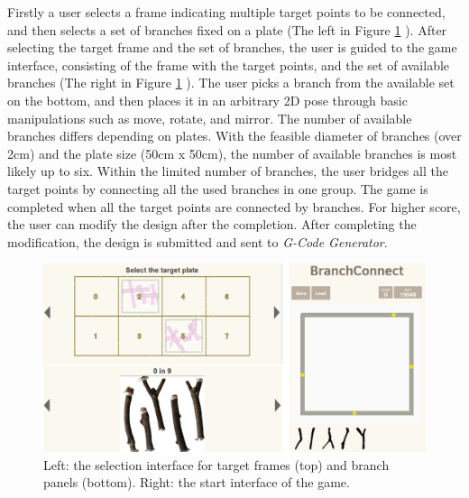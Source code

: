 Firstly a user selects a frame indicating multiple target points to be connected, and then selects a set of branches fixed on a plate (The left in Figure \ref{fig:game_interface} ).
After selecting the target frame and the set of branches, the user is guided to the game interface, consisting of the frame with the target points, and the set of available branches (The right in Figure \ref{fig:game_interface} ).
The user picks a branch from the available set on the bottom, and then places it in an arbitrary 2D pose through basic manipulations such as move, rotate, and mirror.
The number of available branches differs depending on plates.
With the feasible diameter of branches (over 2cm) and the plate size (50cm x 50cm), the number of available branches is most likely up to six.
Within the limited number of branches, the user bridges all the target points by connecting all the used branches in one group.
The game is completed when all the target points are connected by branches.
For higher score, the user can modify the design after the completion.
After completing the modification, the design is submitted and sent to \textit{G-Code Generator}.

\begin{figure}[H]
  \begin{center}
    \includegraphics[width = 0.4\paperwidth]{images/interface/game_interface.png}
    \caption{Left: the selection interface for target frames (top) and branch panels (bottom). Right: the start interface of the game.}
    \label{fig:game_interface}
  \end{center}
\end{figure}
%
